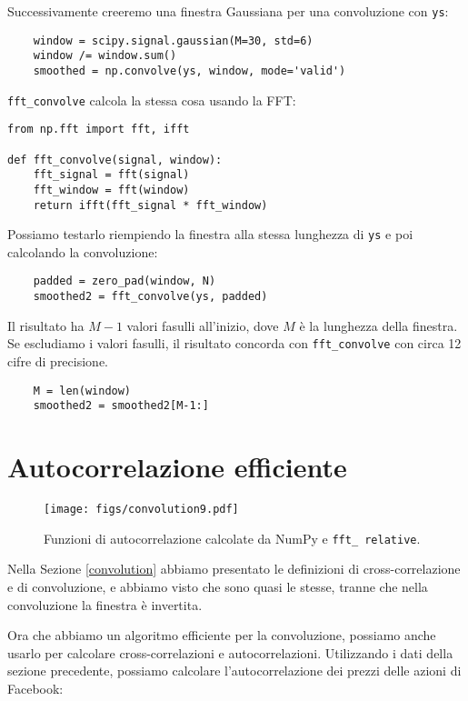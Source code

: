 \documentclass[12pt,a4paper]{book}
\begin{document}
Successivamente creeremo una finestra Gaussiana per una convoluzione con {\tt ys}:

\begin{verbatim} 
    window = scipy.signal.gaussian(M=30, std=6)
    window /= window.sum()
    smoothed = np.convolve(ys, window, mode='valid')
 \end{verbatim} 

\verb"fft_convolve" calcola la stessa cosa usando la FFT:

\begin{verbatim} 
from np.fft import fft, ifft

def fft_convolve(signal, window):
    fft_signal = fft(signal)
    fft_window = fft(window)
    return ifft(fft_signal * fft_window)
 \end{verbatim} 

Possiamo testarlo riempiendo la finestra alla stessa lunghezza di {\tt ys} e poi calcolando la convoluzione:

\begin{verbatim} 
    padded = zero_pad(window, N)
    smoothed2 = fft_convolve(ys, padded)
 \end{verbatim} 

Il risultato ha $M-1$ valori fasulli all'inizio, dove $M$ è la lunghezza della finestra. Se escludiamo i valori fasulli, il risultato concorda con \verb"fft_convolve" con circa 12 cifre di precisione.

\begin{verbatim} 
    M = len(window)
    smoothed2 = smoothed2[M-1:]
 \end{verbatim} 

\section{Autocorrelazione efficiente} 

\begin{figure} 

\centerline{\texttt{[image: figs/convolution9.pdf]}} \caption{Funzioni di autocorrelazione calcolate da NumPy e {\tt fft\_ relative}.} \label{fig.convolution9} \end{figure} 

Nella Sezione \ref{convolution} abbiamo presentato le definizioni di cross-correlazione e di convoluzione, e abbiamo visto che sono quasi le stesse, tranne che nella convoluzione la finestra è invertita.

Ora che abbiamo un algoritmo efficiente per la convoluzione, possiamo anche usarlo per calcolare cross-correlazioni e autocorrelazioni. Utilizzando i dati della sezione precedente, possiamo calcolare l'autocorrelazione dei prezzi delle azioni di Facebook:
\end{document}
